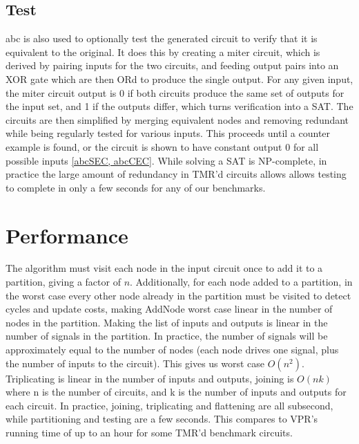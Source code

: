 \documentclass[12pt,final,oneside]{dwThesis} %
\begin{document}
   \subsection{Test}\label{algTest}
   abc is also used to optionally test the generated circuit to verify that it is equivalent to the original. It does this by creating a miter circuit, which is derived by pairing inputs for the two circuits, and feeding output pairs into an XOR gate which are then ORd to produce the single output. For any given input, the miter circuit output is 0 if both circuits produce the same set of outputs for the input set, and 1 if the outputs differ, which turns verification into a \ac{SAT}.
   The circuits are then simplified by merging equivalent nodes and removing redundant while being regularly tested for various inputs. This proceeds until a counter example is found, or the circuit is shown to have constant output 0 for all possible inputs \ref{abcSEC, abcCEC}.
   While solving a \ac{SAT} is NP-complete, in practice the large amount of redundancy in TMR'd circuits allows allows testing to complete in only a few seconds for any of our benchmarks.

   \section{Performance}
   The algorithm must visit each node in the input circuit once to add it to a partition, giving a factor of $n$.
   Additionally, for each node added to a partition, in the worst case every other node already in the partition must be visited to detect cycles and update costs, making AddNode worst case linear in the number of nodes in the partition.
   Making the list of inputs and outputs is linear in the number of signals in the partition. In practice, the number of signals will be approximately equal to the number of nodes (each node drives one signal, plus the number of inputs to the circuit).
   This gives us worst case $O(n^2)$.
   Triplicating is linear in the number of inputs and outputs, joining is $O(nk)$ where n is the number of circuits, and k is the number of inputs and outputs for each circuit. 
   In practice, joining, triplicating and flattening are all subsecond, while partitioning and testing are a few seconds. This compares to \ac{VPR}'s running time of up to an hour for some \ac{TMR}'d benchmark circuits.
   
\end{document}
